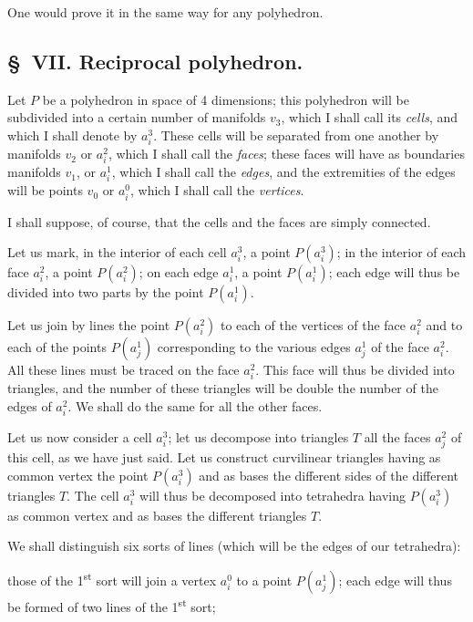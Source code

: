 \documentclass{article}
\begin{document}
One would prove it in the same way for any polyhedron.

\subsection*{\S~VII. Reciprocal polyhedron.}

Let $P$ be a polyhedron in space of 4 dimensions; this polyhedron will be subdivided into a certain number of manifolds $v_{3}$, which I shall call its \emph{cells}, and which I shall denote by $a^{3}_{i}$. These cells will be separated from one another by manifolds $v_{2}$ or $a^{2}_{i}$, which I shall call the \emph{faces}; these faces will have as boundaries manifolds $v_{1}$, or $a^{1}_{i}$, which I shall call the \emph{edges}, and the extremities of the edges will be points $v_{0}$ or $a^{0}_{i}$, which I shall call the \emph{vertices}.

I shall suppose, of course, that the cells and the faces are simply connected.

Let us mark, in the interior of each cell $a^{3}_{i}$, a point $P(a^{3}_{i})$; in the interior of each face $a^{2}_{i}$, a point $P(a^{2}_{i})$; on each edge $a^{1}_{i}$, a point $P(a^{1}_{i})$; each edge will thus be divided into two parts by the point $P(a^{1}_{i})$.

Let us join by lines the point $P(a^{2}_{i})$ to each of the vertices of the face $a^{2}_{i}$ and to each of the points $P(a^{1}_{j})$ corresponding to the various edges $a^{1}_{j}$ of the face $a^{2}_{i}$. All these lines must be traced on the face $a^{2}_{i}$. This face will thus be divided into triangles, and the number of these triangles will be double the number of the edges of $a^{2}_{i}$. We shall do the same for all the other faces.

Let us now consider a cell $a^{3}_{i}$; let us decompose into triangles $T$ all the faces $a^{2}_{j}$ of this cell, as we have just said. Let us construct curvilinear triangles having as common vertex the point $P(a^{3}_{i})$ and as bases the different sides of the different triangles $T$. The cell $a^{3}_{i}$ will thus be decomposed into tetrahedra having $P(a^{3}_{i})$ as common vertex and as bases the different triangles $T$.


We shall distinguish six sorts of lines (which will be the edges of our tetrahedra):

those of the 1\textsuperscript{st} sort will join a vertex $a^{0}_{i}$ to a point $P(a^{1}_{j})$; each edge will thus be formed of two lines of the 1\textsuperscript{st} sort;
\end{document}
